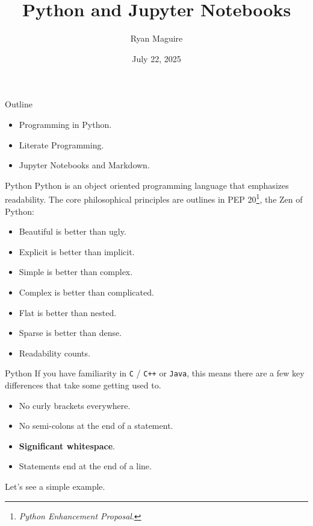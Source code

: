 \documentclass{beamer}
\title{Python and Jupyter Notebooks}
\author{Ryan Maguire}
\date{July 22, 2025}
\begin{document}
    \maketitle
    \begin{frame}{Outline}
        \begin{itemize}
            \item Programming in Python.
            \item Literate Programming.
            \item Jupyter Notebooks and Markdown.
        \end{itemize}
    \end{frame}
    \begin{frame}{Python}
        Python is an object oriented programming language that
        emphasizes readability. The core philosophical principles are
        outlines in PEP 20\footnote{%
            \textit{Python Enhancement Proposal}.
        }, the Zen of Python:
        \begin{itemize}
            \item
                Beautiful is better than ugly.
            \item
                Explicit is better than implicit.
            \item
                Simple is better than complex.
            \item
                Complex is better than complicated.
            \item
                Flat is better than nested.
            \item
                Sparse is better than dense.
            \item
                Readability counts.
        \end{itemize}
    \end{frame}
    \begin{frame}{Python}
        If you have familiarity in \texttt{C} / \texttt{C++} or
        \texttt{Java}, this means there are a few key differences that take
        some getting used to.
        \begin{itemize}
            \item No curly brackets everywhere.
            \item No semi-colons at the end of a statement.
            \item \textbf{Significant whitespace}.
            \item Statements end at the end of a line.
        \end{itemize}
        Let's see a simple example.
    \end{frame}
\end{document}
